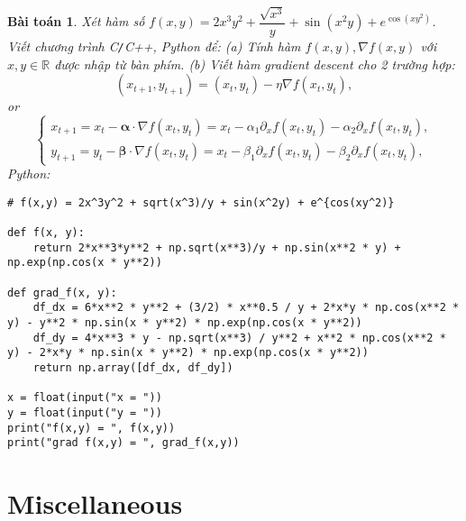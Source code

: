 \documentclass{article}
\newtheorem{baitoan}{Bài toán}
\begin{document}
\begin{baitoan}
	Xét hàm số $f(x,y) = 2x^3y^2 + \dfrac{\sqrt{x^3}}{y} + \sin(x^2y) + e^{\cos(xy^2)}$. Viết chương trình {\sf C{\tt/}C++, Python} để: (a) Tính hàm $f(x,y),\nabla f(x,y)$ với $x,y\in\mathbb{R}$ được nhập từ bàn phím. (b) Viết hàm gradient descent cho 2 trường hợp:
	\begin{equation*}
		(x_{t+1},y_{t+1}) = (x_t,y_t) - \eta\nabla f(x_t,y_t),
	\end{equation*}
	or
	\begin{equation*}
		\left\{\begin{split}
			x_{t+1} = x_t - \boldsymbol{\alpha}\cdot\nabla f(x_t,y_t) = x_t - \alpha_1\partial_xf(x_t,y_t) - \alpha_2\partial_xf(x_t,y_t),\\
			y_{t+1} = y_t - \boldsymbol{\beta}\cdot\nabla f(x_t,y_t) = x_t - \beta_1\partial_xf(x_t,y_t) - \beta_2\partial_xf(x_t,y_t),
		\end{split}\right.
	\end{equation*}
	Python:
	\begin{verbatim}
# f(x,y) = 2x^3y^2 + sqrt(x^3)/y + sin(x^2y) + e^{cos(xy^2)}

def f(x, y):
    return 2*x**3*y**2 + np.sqrt(x**3)/y + np.sin(x**2 * y) + np.exp(np.cos(x * y**2))

def grad_f(x, y):
    df_dx = 6*x**2 * y**2 + (3/2) * x**0.5 / y + 2*x*y * np.cos(x**2 * y) - y**2 * np.sin(x * y**2) * np.exp(np.cos(x * y**2))
    df_dy = 4*x**3 * y - np.sqrt(x**3) / y**2 + x**2 * np.cos(x**2 * y) - 2*x*y * np.sin(x * y**2) * np.exp(np.cos(x * y**2))
    return np.array([df_dx, df_dy])

x = float(input("x = "))
y = float(input("y = "))
print("f(x,y) = ", f(x,y))
print("grad f(x,y) = ", grad_f(x,y))
	\end{verbatim}
\end{baitoan}


\section{Miscellaneous}


\printbibliography[heading=bibintoc]
	
\end{document}
